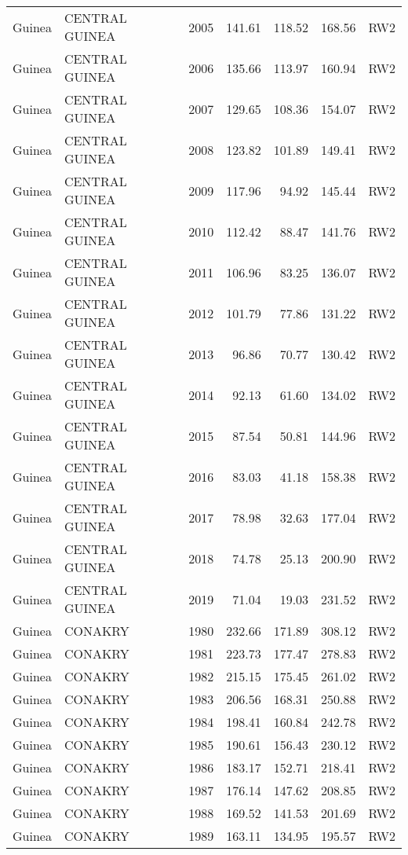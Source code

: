 \begin{longtable}{lllrrrl}
  Guinea & CENTRAL GUINEA & 2005 & 141.61 & 118.52 & 168.56 & RW2 \\ 
  Guinea & CENTRAL GUINEA & 2006 & 135.66 & 113.97 & 160.94 & RW2 \\ 
  Guinea & CENTRAL GUINEA & 2007 & 129.65 & 108.36 & 154.07 & RW2 \\ 
  Guinea & CENTRAL GUINEA & 2008 & 123.82 & 101.89 & 149.41 & RW2 \\ 
  Guinea & CENTRAL GUINEA & 2009 & 117.96 & 94.92 & 145.44 & RW2 \\ 
  Guinea & CENTRAL GUINEA & 2010 & 112.42 & 88.47 & 141.76 & RW2 \\ 
  Guinea & CENTRAL GUINEA & 2011 & 106.96 & 83.25 & 136.07 & RW2 \\ 
  Guinea & CENTRAL GUINEA & 2012 & 101.79 & 77.86 & 131.22 & RW2 \\ 
  Guinea & CENTRAL GUINEA & 2013 & 96.86 & 70.77 & 130.42 & RW2 \\ 
  Guinea & CENTRAL GUINEA & 2014 & 92.13 & 61.60 & 134.02 & RW2 \\ 
  Guinea & CENTRAL GUINEA & 2015 & 87.54 & 50.81 & 144.96 & RW2 \\ 
  Guinea & CENTRAL GUINEA & 2016 & 83.03 & 41.18 & 158.38 & RW2 \\ 
  Guinea & CENTRAL GUINEA & 2017 & 78.98 & 32.63 & 177.04 & RW2 \\ 
  Guinea & CENTRAL GUINEA & 2018 & 74.78 & 25.13 & 200.90 & RW2 \\ 
  Guinea & CENTRAL GUINEA & 2019 & 71.04 & 19.03 & 231.52 & RW2 \\ 
  Guinea & CONAKRY & 1980 & 232.66 & 171.89 & 308.12 & RW2 \\ 
  Guinea & CONAKRY & 1981 & 223.73 & 177.47 & 278.83 & RW2 \\ 
  Guinea & CONAKRY & 1982 & 215.15 & 175.45 & 261.02 & RW2 \\ 
  Guinea & CONAKRY & 1983 & 206.56 & 168.31 & 250.88 & RW2 \\ 
  Guinea & CONAKRY & 1984 & 198.41 & 160.84 & 242.78 & RW2 \\ 
  Guinea & CONAKRY & 1985 & 190.61 & 156.43 & 230.12 & RW2 \\ 
  Guinea & CONAKRY & 1986 & 183.17 & 152.71 & 218.41 & RW2 \\ 
  Guinea & CONAKRY & 1987 & 176.14 & 147.62 & 208.85 & RW2 \\ 
  Guinea & CONAKRY & 1988 & 169.52 & 141.53 & 201.69 & RW2 \\ 
  Guinea & CONAKRY & 1989 & 163.11 & 134.95 & 195.57 & RW2 \\ 

\end{longtable}
